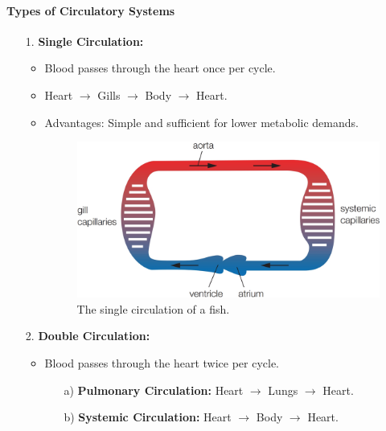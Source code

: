 \paragraph{Types of Circulatory Systems}
\begin{itemize}
    \item[1.] \textbf{Single Circulation:}
    \begin{itemize}
        \item Blood passes through the heart once per cycle.
        \item Heart $\rightarrow$ Gills $\rightarrow$ Body $\rightarrow$ Heart.
        \item Advantages: Simple and sufficient for lower metabolic demands.
        \begin{figure}[H]
            \centering
            \includegraphics[scale=0.15]{Biology/1B/Images/1B-1-1.png}
            \caption{The single circulation of a fish.}
        \end{figure}
    \end{itemize}
    \item[2.] \textbf{Double Circulation:}
    \begin{itemize}
        \item Blood passes through the heart twice per cycle.
        \begin{itemize}
            \item[a)] \textbf{Pulmonary Circulation:} Heart $\rightarrow$ Lungs $\rightarrow$ Heart.
            \item[b)] \textbf{Systemic Circulation:} Heart $\rightarrow$ Body $\rightarrow$ Heart.
        \end{itemize}
        \begin{figure}[H]
            \centering

\end{figure}
\end{itemize}
\end{itemize}
